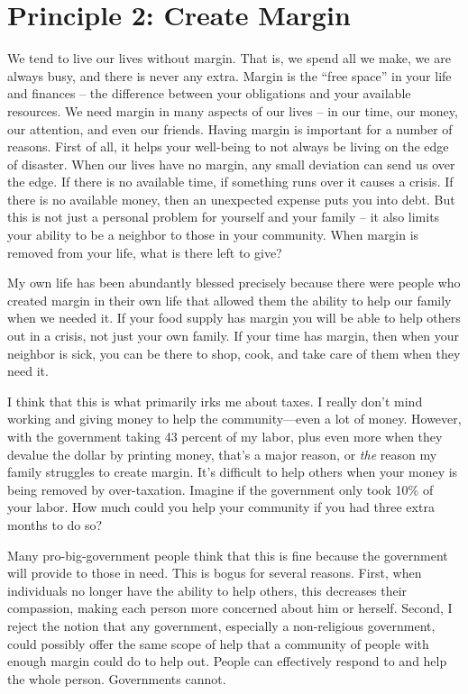 \section{Principle 2: Create Margin}

We tend to live our lives without margin. That is, we spend all we make,
we are always busy, and there is never any extra. Margin is the “free
space” in your life and finances – the difference between your
obligations and your available resources.  We need margin in many
aspects of our lives – in our time, our money, our attention, and even
our friends.  Having margin is important for a number of reasons. 
First of all, it helps your well-being to not always be living on the
edge of disaster.  When our lives have no margin, any small deviation
can send us over the edge.  If there is no available time, if something
runs over it causes a crisis.  If there is no available money, then an
unexpected expense puts you into debt.  But this is not just a personal
problem for yourself and your family – it also limits your ability to
be a neighbor to those in your community. 
When margin is
removed from your life, what is there left to give?  

My own life has been abundantly blessed precisely because there were
people who created margin in their own life that allowed them the
ability to help our family when we needed it. If your food supply has
margin you will be able to help others out
in a crisis, not just
your own family.  If
your time has margin, then when your neighbor is sick, you can be there
to shop, cook, and take care of them when they need it.

I think that this is what primarily irks me about taxes. I really
don't mind working and giving money to help the
community—even a lot of money. However, with the government taking 43
percent of my labor,
plus even more when they devalue the dollar by printing money, 
that’s a major reason,
or \textit{the
}reason my family
struggles to create margin. It’s difficult to help others when your
money is being removed by over-taxation.  Imagine if the government
only took 10\% of your labor.  How much could you help your community
if you had three extra months to do so?

Many pro-big-government people think that this is fine because the
government will provide to those in need. This is bogus for several
reasons. First, when individuals no longer have the ability to help
others, this decreases
their compassion,
making each person more concerned about him or herself.  Second, I
reject the notion that
any government,
especially a non-religious government, could possibly offer the same
scope of help that a
community of people with enough margin could do to help out. People
can effectively respond to and help the whole person. Governments
cannot. 

